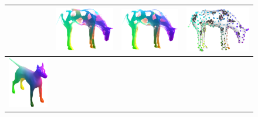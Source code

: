 \begin{figure}[b!]
\begin{tabular}[width=0.8\textwidth]{c|ccc}
		& \includegraphics[scale=0.5]{figures/holes_horse_16_PFM.png}&
		\includegraphics[scale=0.5]{figures/holes_horse_16.png} & \includegraphics[scale=0.47]{figures/holes_horse_16_sparse.png} \\ \hline \includegraphics[scale=0.5]{figures/dog_base.png} &

\end{tabular}
\end{figure}
